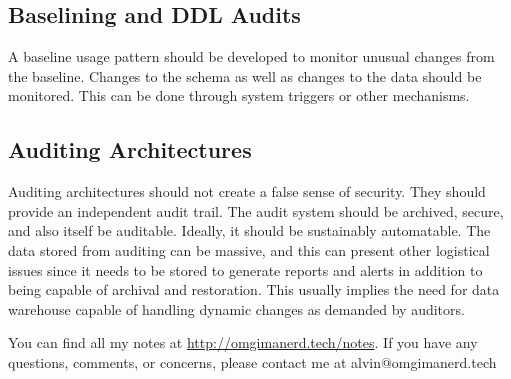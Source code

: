 \documentclass{math}
\begin{document}
\subsection*{Baselining and DDL Audits}
A baseline usage pattern should be developed to monitor unusual changes from
the baseline. Changes to the schema as well as changes to the data should be
monitored. This can be done through system triggers or other mechanisms.

\subsection*{Auditing Architectures}
Auditing architectures should not create a false sense of security. They should
provide an independent audit trail. The audit system should be archived, secure,
and also itself be auditable. Ideally, it should be sustainably automatable. The
data stored from auditing can be massive, and this can present other logistical
issues since it needs to be stored to generate reports and alerts in addition
to being capable of archival and restoration. This usually implies the need for
data warehouse capable of handling dynamic changes as demanded by auditors.

\begin{center}
  You can find all my notes at \url{http://omgimanerd.tech/notes}. If you have
  any questions, comments, or concerns, please contact me at
  alvin@omgimanerd.tech
\end{center}
\end{document}
